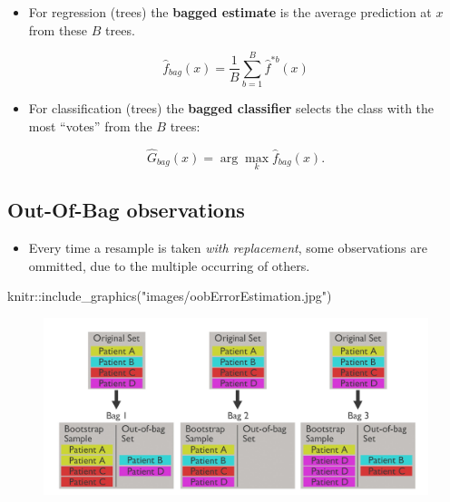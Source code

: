 \documentclass[
  letterpaper,
  DIV=11,
  numbers=noendperiod]{scrartcl}
\newenvironment{Shaded}{\begin{snugshade}}{\end{snugshade}}
\newcommand{\FunctionTok}[1]{\textcolor[rgb]{0.28,0.35,0.67}{#1}}
\newcommand{\NormalTok}[1]{\textcolor[rgb]{0.00,0.23,0.31}{#1}}
\newcommand{\SpecialCharTok}[1]{\textcolor[rgb]{0.37,0.37,0.37}{#1}}
\newcommand{\StringTok}[1]{\textcolor[rgb]{0.13,0.47,0.30}{#1}}
\providecommand{\tightlist}{%
  \setlength{\itemsep}{0pt}\setlength{\parskip}{0pt}}\usepackage{longtable,booktabs,array}
\begin{document}
\begin{itemize}
\tightlist
\item
  For regression (trees) the \textbf{bagged estimate} is the average
  prediction at \(x\) from these \(B\) trees.
\end{itemize}

\[\hat f_{bag}(x)=\frac 1B \sum_{b=1}^B \hat f^{*b}(x) \]

\begin{itemize}
\tightlist
\item
  For classification (trees) the \textbf{bagged classifier} selects the
  class with the most ``votes'' from the \(B\) trees:
\end{itemize}

\[
\hat G_{bag}(x) = \arg \max_k \hat f_{bag}(x).
\]

\hypertarget{out-of-bag-observations}{%
\subsection{Out-Of-Bag observations}\label{out-of-bag-observations}}

\begin{itemize}
\tightlist
\item
  Every time a resample is taken \emph{with replacement}, some
  observations are ommitted, due to the multiple occurring of others.
\end{itemize}

\begin{Shaded}
\begin{Highlighting}[]
\NormalTok{knitr}\SpecialCharTok{::}\FunctionTok{include\_graphics}\NormalTok{(}\StringTok{"images/oobErrorEstimation.jpg"}\NormalTok{)}
\end{Highlighting}
\end{Shaded}

\begin{figure}[H]

{\centering \includegraphics[width=1\textwidth,height=\textheight]{images/oobErrorEstimation.jpg}

}

\end{figure}
\end{document}
